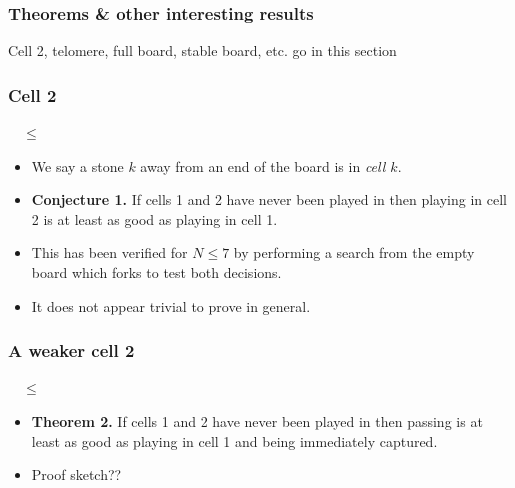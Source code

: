 \documentclass{beamer}
\begin{document}
    \begin{frame}
        \frametitle{Theorems \& other interesting results}
        Cell 2, telomere, full board, stable board, etc. go in this section
    \end{frame}

    \begin{frame}
        \frametitle{Cell 2}
        \begin{center}
            \cleargoban
            \showgoban[b2,k2]\ \ $\leq$
            \cleargoban
            \showgoban[b2,k2]
        \end{center}
        \begin{itemize}
            \item We say a stone $k$ away from an end of the board is in \textit{cell $k$}.
            \item \textbf{Conjecture 1.} If cells 1 and 2 have never been played
                in then playing in cell 2 is at least as good as playing in cell 1.
            \pause
            \item This has been verified for $N \leq 7$ by performing a search from the empty board which forks
                to test both decisions.
            \item It does not appear trivial to prove in general.
        \end{itemize}
    \end{frame}

    \begin{frame}
        \frametitle{A weaker cell 2}
        \begin{center}
            \cleargoban
            \showgoban[b2,k2]\ \ $\leq$
            \cleargoban
            \showgoban[b2,k2]
        \end{center}
        \begin{itemize}
            \item \textbf{Theorem 2.} If cells 1 and 2 have never been played
                in then passing is at least as good as playing in cell 1 and being immediately captured.
            \pause
            \item Proof sketch??
        \end{itemize}
    \end{frame}
\end{document}
